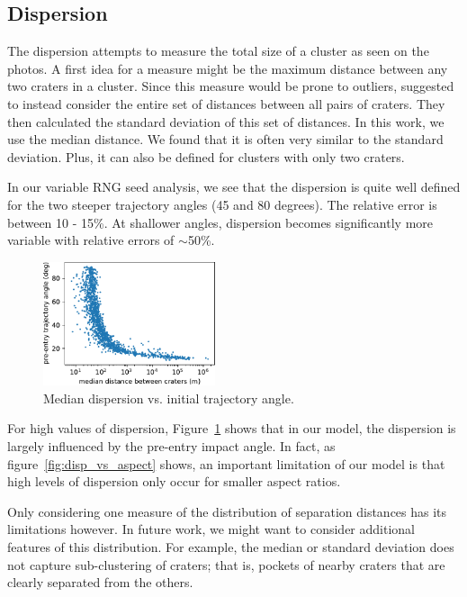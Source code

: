 \subsection{Dispersion}
The dispersion attempts to measure the total size of a cluster as seen on the photos.
A first idea for a measure might be the maximum distance between any two craters in a cluster.
Since this measure would be prone to outliers, \cite{daubar2019recently} suggested to instead consider the entire set of distances between all pairs of craters.
They then calculated the standard deviation of this set of distances.
In this work, we use the median distance. We found that it is often very similar to the standard deviation. Plus, it can also be defined for clusters with only two craters.

In our variable RNG seed analysis, we see that the dispersion is quite well defined for the two steeper trajectory angles (45 and 80 degrees). The relative error is between 10 - 15\%. At shallower angles, dispersion becomes significantly more variable with relative errors of $\sim$50\%. 

\begin{figure}[htbp]
    \centering
    \includegraphics[width=0.45\textwidth]{figures/disp_vs_angle}
    \caption{Median dispersion vs. initial trajectory angle.}
    \label{fig:disp_vs_angle}
\end{figure}

For high values of dispersion, Figure~\ref{fig:disp_vs_angle} shows that in our model, the dispersion is largely influenced by the pre-entry impact angle. In fact, as figure~\ref{fig:disp_vs_aspect} shows, an important limitation of our model is that high levels of dispersion only occur for smaller aspect ratios.

Only considering one measure of the distribution of separation distances has its limitations however. In future work, we might want to consider additional features of this distribution. For example, the median or standard deviation does not capture sub-clustering of craters; that is, pockets of nearby craters that are clearly separated from the others.

